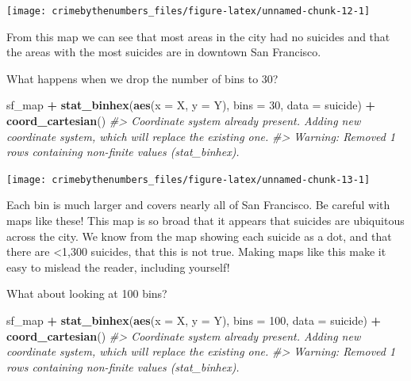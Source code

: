 \documentclass[
  12pt,
]{book}
\newenvironment{Shaded}{\begin{snugshade}}{\end{snugshade}}
\newcommand{\CommentTok}[1]{\textcolor[rgb]{0.37,0.37,0.37}{\textit{#1}}}
\newcommand{\DataTypeTok}[1]{\textcolor[rgb]{0.27,0.27,0.27}{#1}}
\newcommand{\DecValTok}[1]{\textcolor[rgb]{0.06,0.06,0.06}{#1}}
\newcommand{\KeywordTok}[1]{\textcolor[rgb]{0.27,0.27,0.27}{\textbf{#1}}}
\newcommand{\NormalTok}[1]{#1}
\newcommand{\OperatorTok}[1]{\textcolor[rgb]{0.43,0.43,0.43}{\textbf{#1}}}
\newcommand{\StringTok}[1]{\textcolor[rgb]{0.5,0.5,0.5}{#1}}
\begin{document}
\begin{center}\texttt{[image: crimebythenumbers\_files/figure-latex/unnamed-chunk-12-1]} \end{center}

From this map we can see that most areas in the city had no suicides and that the areas with the most suicides are in downtown San Francisco.

What happens when we drop the number of bins to 30?

\begin{Shaded}
\begin{Highlighting}[]
\NormalTok{sf\_map }\OperatorTok{+}
\StringTok{  }\KeywordTok{stat\_binhex}\NormalTok{(}\KeywordTok{aes}\NormalTok{(}\DataTypeTok{x =}\NormalTok{ X, }\DataTypeTok{y =}\NormalTok{ Y),}
              \DataTypeTok{bins =} \DecValTok{30}\NormalTok{,}
              \DataTypeTok{data =}\NormalTok{ suicide) }\OperatorTok{+}
\StringTok{  }\KeywordTok{coord\_cartesian}\NormalTok{() }
\CommentTok{\#> Coordinate system already present. Adding new coordinate system, which will replace the existing one.}
\CommentTok{\#> Warning: Removed 1 rows containing non{-}finite values (stat\_binhex).}
\end{Highlighting}
\end{Shaded}

\begin{center}\texttt{[image: crimebythenumbers\_files/figure-latex/unnamed-chunk-13-1]} \end{center}

Each bin is much larger and covers nearly all of San Francisco. Be careful with maps like these! This map is so broad that it appears that suicides are ubiquitous across the city. We know from the map showing each suicide as a dot, and that there are \textless1,300 suicides, that this is not true. Making maps like this make it easy to mislead the reader, including yourself!

What about looking at 100 bins?

\begin{Shaded}
\begin{Highlighting}[]
\NormalTok{sf\_map }\OperatorTok{+}
\StringTok{  }\KeywordTok{stat\_binhex}\NormalTok{(}\KeywordTok{aes}\NormalTok{(}\DataTypeTok{x =}\NormalTok{ X, }\DataTypeTok{y =}\NormalTok{ Y),}
              \DataTypeTok{bins =} \DecValTok{100}\NormalTok{,}
              \DataTypeTok{data =}\NormalTok{ suicide) }\OperatorTok{+}
\StringTok{  }\KeywordTok{coord\_cartesian}\NormalTok{() }
\CommentTok{\#> Coordinate system already present. Adding new coordinate system, which will replace the existing one.}
\CommentTok{\#> Warning: Removed 1 rows containing non{-}finite values (stat\_binhex).}
\end{Highlighting}
\end{Shaded}
\end{document}
